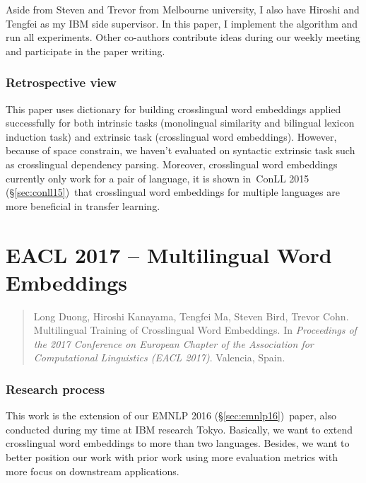 \documentclass[12pt,twoside,final,hidelinks]{ltthesis}
\theoremstyle{definition}
\newcommand\conllv{ConLL 2015 (\S\ref{sec:conll15})}
\newcommand\emnlpvi{EMNLP 2016 (\S\ref{sec:emnlp16})}
\begin{document}
Aside from Steven and Trevor from Melbourne university, I also have Hiroshi and Tengfei as my IBM side supervisor. In this paper, I implement the algorithm
and run all experiments. Other co-authors contribute ideas during our weekly meeting and participate in the paper writing. 

\subsubsection{Retrospective view}
This paper uses dictionary for building crosslingual word embeddings applied successfully for both intrinsic tasks (monolingual similarity and bilingual lexicon
induction task) and extrinsic task (crosslingual word embeddings). However, because of space constrain, we haven't evaluated on syntactic extrinsic task such as 
crosslingual dependency parsing. Moreover, crosslingual word embeddings currently only work for a pair of language, it is shown in~\conllv\ that crosslingual word embeddings for multiple languages are more beneficial in transfer learning. 




\section{EACL 2017 -- Multilingual Word Embeddings}
\label{sec:eacl17}
\begin{quote}
Long Duong, Hiroshi Kanayama, Tengfei Ma, Steven Bird, Trevor Cohn. Multilingual Training of Crosslingual Word Embeddings. In \textit{Proceedings of the 2017 Conference on European Chapter of the Association for Computational Linguistics (EACL 2017)}. Valencia, Spain. 
\end{quote}

\subsubsection{Research process}
This work is the extension of our \emnlpvi\ paper, also conducted during my time at IBM research Tokyo. Basically, we want to extend crosslingual word embeddings to more than two languages. Besides, we want to better position our work with prior work using more evaluation metrics with more focus on downstream applications. 
\end{document}
